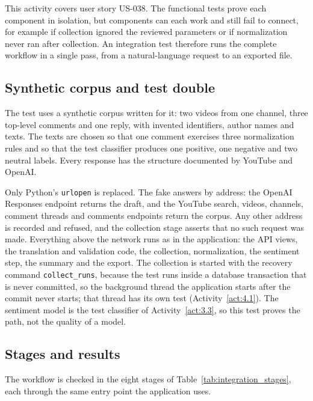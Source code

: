 This activity covers user story US-038. The functional tests prove each component in isolation, but components can each work and still fail to connect, for example if collection ignored the reviewed parameters or if normalization never ran after collection. An integration test therefore runs the complete workflow in a single pass, from a natural-language request to an exported file.

\subsection{Synthetic corpus and test double}

The test uses a synthetic corpus written for it: two videos from one channel, three top-level comments and one reply, with invented identifiers, author names and texts. The texts are chosen so that one comment exercises three normalization rules and so that the test classifier produces one positive, one negative and two neutral labels. Every response has the structure documented by YouTube and OpenAI.

Only Python's \texttt{urlopen} is replaced. The fake answers by address: the OpenAI Responses endpoint returns the draft, and the YouTube search, videos, channels, comment threads and comments endpoints return the corpus. Any other address is recorded and refused, and the collection stage asserts that no such request was made. Everything above the network runs as in the application: the API views, the translation and validation code, the collection, normalization, the sentiment step, the summary and the export. The collection is started with the recovery command \texttt{collect\_runs}, because the test runs inside a database transaction that is never committed, so the background thread the application starts after the commit never starts; that thread has its own test (Activity~\ref{act:4.1}). The sentiment model is the test classifier of Activity~\ref{act:3.3}, so this test proves the path, not the quality of a model.

\subsection{Stages and results}

The workflow is checked in the eight stages of Table~\ref{tab:integration_stages}, each through the same entry point the application uses.

